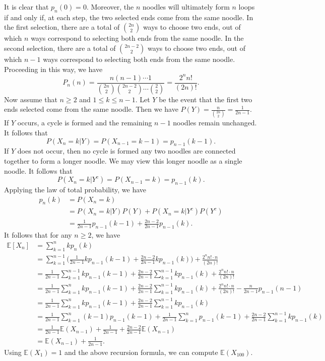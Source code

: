 \documentclass[12pt,letterpaper, onecolumn]{exam}
\begin{document}
\begin{questions}
\begin{solution}
            \quad It is clear that $p_n(0)=0$. Moreover, the $n$ noodles will ultimately form $n$ loops if and only if, at each step, the two selected ends come from the same noodle. In the first selection, there are a total of $\binom{2n}{2}$ ways to choose two ends, out of which $n$ ways correspond to selecting both ends from the same noodle. In the second selection, there are a total of $\binom{2n-2}{2}$ ways to choose two ends, out of which $n-1$ ways correspond to selecting both ends from the same noodle. Proceeding in this way, we have
            $$P_n(n)=\frac{n(n-1)\cdots 1}{\binom{2n}{2}\binom{2n-2}{2}\cdots\binom{2}{2}}=\frac{2^nn!}{(2n)!}.$$
            \quad Now assume that $n\ge 2$ and $1\le k\le n-1$. Let $Y$ be the event that the first two ends selected come from the same noodle. Then we have $P(Y)=\frac{n}{\binom{2n}{2}}=\frac{1}{2n-1}$. If $Y$ occurs, a cycle is formed and the remaining $n-1$ noodles remain unchanged. It follows that 
            $$P(X_n=k|Y)=P(X_{n-1}=k-1)=p_{n-1}(k-1).$$
            If $Y$ does not occur, then no cycle is formed any two noodles are connected together to form a longer noodle. We may view this longer noodle as a single noodle. It follows that 
            $$P(X_n=k|Y^c)=P(X_{n-1}=k)=p_{n-1}(k).$$
            Applying the law of total probability, we have 
            \begin{align*}
                p_n(k)&=P(X_n=k)\\
                &=P(X_n=k|Y)P(Y)+P(X_n=k|Y^c)P(Y^c)\\
                &=\frac{1}{2n-1}p_{n-1}(k-1)+\frac{2n-2}{2n-1}p_{n-1}(k).
            \end{align*}
            It follows that for any $n\ge 2$, we have 
            \begin{align*}
                \mathbb{E}[X_n]&=\sum\limits_{k=1}^nkp_n(k)\\
                &=\sum\limits_{k=1}^{n-1}\Big(\frac{1}{2n-1}kp_{n-1}(k-1)+\frac{2n-2}{2n-1}kp_{n-1}(k)\Big)+\frac{2^nn!\cdot n}{(2n)!}\\
                &=\frac{1}{2n-1}\sum\limits_{k=1}^{n-1}kp_{n-1}(k-1)+\frac{2n-2}{2n-1}\sum\limits_{k=1}^{n-1}kp_{n-1}(k)+\frac{2^nn!\cdot n}{(2n)!}\\
                &=\frac{1}{2n-1}\sum\limits_{k=1}^{n}kp_{n-1}(k-1)+\frac{2n-2}{2n-1}\sum\limits_{k=1}^{n-1}kp_{n-1}(k)+\frac{2^nn!\cdot n}{(2n)!}-\frac{n}{2n-1}p_{n-1}(n-1)\\
                &=\frac{1}{2n-1}\sum\limits_{k=1}^{n}kp_{n-1}(k-1)+\frac{2n-2}{2n-1}\sum\limits_{k=1}^{n-1}kp_{n-1}(k)\\
                &=\frac{1}{2n-1}\sum\limits_{k=1}^n(k-1)p_{n-1}(k-1)+\frac{1}{2n-1}\sum\limits_{k=1}^np_{n-1}(k-1)+\frac{2n-2}{2n-1}\sum\limits_{k=1}^{n-1}kp_{n-1}(k)\\
                &=\frac{1}{2n-1}\mathbb{E}(X_{n-1})+\frac{1}{2n-1}+\frac{2n-2}{2n-1}\mathbb{E}(X_{n-1})\\
                &=\mathbb{E}(X_{n-1})+\frac{1}{2n-1}.
            \end{align*}
            Using $\mathbb{E}(X_1)=1$ and the above recursion formula, we can compute $\mathbb{E}(X_{100})$.


\end{solution}
\end{questions}
\end{document}
